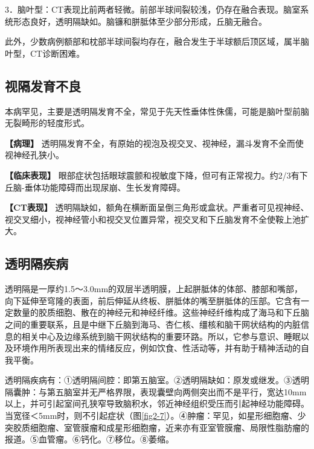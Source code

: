 3．脑叶型：CT表现比前两者轻微。前部半球间裂较浅，仍存在融合表现。脑室系统形态良好，透明隔缺如。脑镰和胼胝体至少部分形成，丘脑无融合。

此外，少数病例额部和枕部半球间裂均存在，融合发生于半球额后顶区域，属半脑叶型，CT诊断困难。

\subsection{视隔发育不良}

本病罕见，主要是透明隔发育不全，常见于先天性垂体性侏儒，可能是脑叶型前脑无裂畸形的轻度形式。

\textbf{【病理】}
透明隔发育不全，有原始的视泡及视交叉、视神经，漏斗发育不全而使视神经孔狭小。

\textbf{【临床表现】}
眼部症状包括眼球震颤和视敏度下降，但可有正常视力。约2/3有下丘脑-垂体功能障碍而出现尿崩、生长发育障碍。

\textbf{【CT表现】}
透明隔缺如，额角在横断面呈倒三角形或盒状。严重者可见视神经、视交叉细小，视神经管小和视交叉位置异常，视交叉和下丘脑发育不全使鞍上池扩大。

\subsection{透明隔疾病}

透明隔是一厚约1.5～3.0mm的双层半透明膜，上起胼胝体的体部、膝部和嘴部，向下延伸至穹隆的表面，前后伸延从终板、胼胝体的嘴至胼胝体的压部。它含有一定数量的胶质细胞、散在的神经元和神经纤维。这些神经纤维构成了海马和下丘脑之间的重要联系，且是中继下丘脑到海马、杏仁核、缰核和脑干网状结构的内脏信息的相关中心及边缘系统到脑干网状结构的重要环路。所以，它参与意识、睡眠以及环境作用所表现出来的情绪反应，例如饮食、性活动等，并有助于精神活动的自我平衡。

透明隔疾病有：①透明隔间腔：即第五脑室。②透明隔缺如：原发或继发。③透明隔囊肿：与第五脑室并无严格界限，表现囊壁向两侧突出而不是平行，宽达10mm以上，并可引起室间孔狭窄导致脑积水，邻近神经组织受压而引起神经功能障碍。当宽径＜5mm时，则不引起症状（图\ref{fig2-7}）。④肿瘤：罕见，如星形细胞瘤、少突胶质细胞瘤、室管膜瘤和成星形细胞瘤，近来亦有亚室管膜瘤、局限性脂肪瘤的报道。⑤血管瘤。⑥钙化。⑦移位。⑧萎缩。


